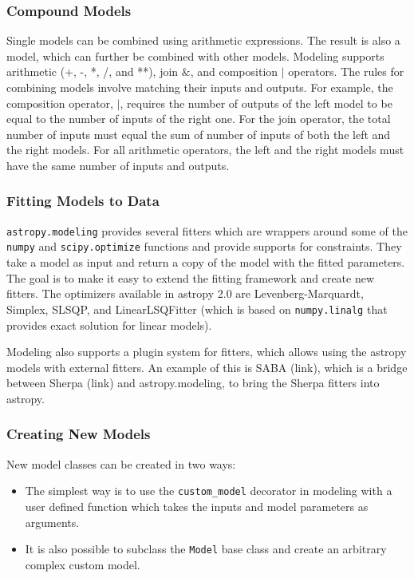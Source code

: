 \documentclass[modern]{aastex61}
\newcommand{\package}[1]{\texttt{#1}\xspace}
\begin{document}
\subsubsection{Compound Models}
Single models can be combined using arithmetic expressions. The result is also a model, which can further be combined with other models. Modeling supports arithmetic (+, -, *, /, and **), join $\&$, and composition $|$ operators. The rules for combining models involve matching their inputs and outputs. For example, the composition operator, $|$, requires the number of outputs of the left model to be equal to the number of inputs of the right one. For the join operator, the total number of inputs must equal the sum of number of inputs of both the left and the right models. For all arithmetic operators, the left and the right models must have the same number of inputs and outputs. 

\subsubsection{Fitting Models to Data}

\package{astropy.modeling} provides several fitters which are wrappers around some of the \texttt{numpy} and \texttt{scipy.optimize} functions and provide supports for constraints. They take a model as input and return a copy of the model with the fitted parameters. The goal is to make it easy to extend the fitting framework and create new fitters. The optimizers available in astropy 2.0 are Levenberg-Marquardt, Simplex, SLSQP, and LinearLSQFitter (which is based on \texttt{numpy.linalg} that provides exact solution for linear models).

Modeling also supports a plugin system for fitters, which allows using the astropy models with external fitters. An example of this is SABA (link), which is a bridge between Sherpa (link) and astropy.modeling, to bring the Sherpa fitters into astropy.

\subsubsection{Creating New Models}

New model classes can be created in two ways:
\begin{itemize}
   \item The simplest way is to use the \texttt{custom\_model} decorator in modeling with a user defined function which takes the inputs and model parameters as arguments.
   \item It is also possible to subclass the \texttt{Model} base class and create an arbitrary complex custom model.
\end{itemize}
\end{document}

